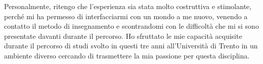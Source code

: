 Personalmente, ritengo che l'esperienza sia stata molto costruttiva e stimolante, perché mi ha permesso di interfacciarmi con un mondo a me nuovo, venendo a contatto il metodo di insegnamento e scontrandomi con le difficoltà che mi si sono presentate davanti durante il percorso. Ho sfruttato le mie capacità acquisite durante il percorso di studi svolto in questi tre anni all'Università di Trento in un ambiente diverso cercando di trasmettere la mia passione per questa disciplina.

